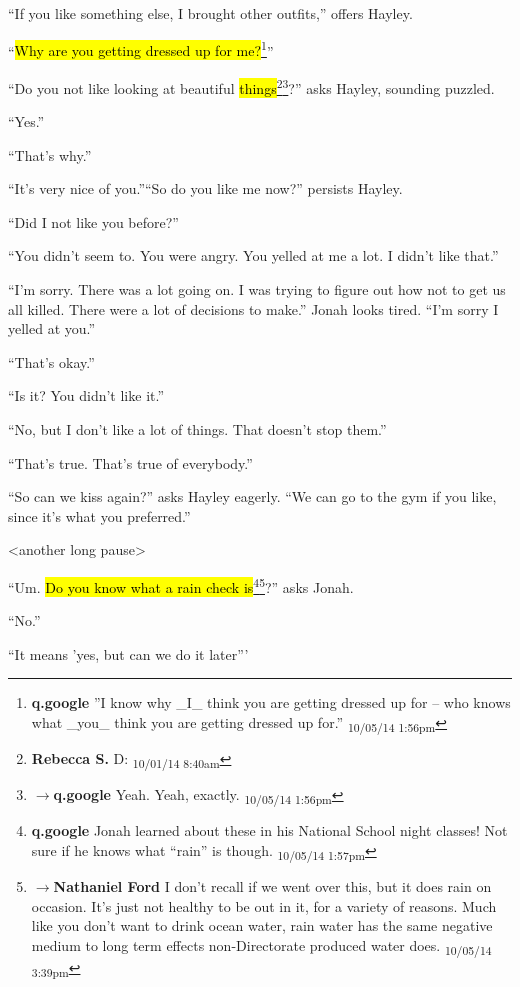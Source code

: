 ``If you like something else, I brought other outfits,'' offers Hayley.

``\hl{Why are you getting dressed up for me?}\footnote{\textbf{q.google }''I know why \_I\_ think you are getting dressed up for -- who knows what \_you\_ think you are getting dressed up for.'' \textsubscript{10/05/14 1:56pm}}''

``Do you not like looking at beautiful \hl{things}\footnote{\textbf{Rebecca S. }D: \textsubscript{10/01/14 8:40am}}\footnote{$\rightarrow$\textbf{q.google }Yeah.  Yeah, exactly. \textsubscript{10/05/14 1:56pm}}?'' asks Hayley, sounding puzzled.

``Yes.''

``That's why.''

``It's very nice of you.''``So do you like me now?'' persists Hayley.

``Did I not like you before?''

``You didn't seem to.  You were angry.  You yelled at me a lot.  I didn't like that.''

``I'm sorry.  There was a lot going on.  I was trying to figure out how not to get us all killed.  There were a lot of decisions to make.''  Jonah looks tired. ``I'm sorry I yelled at you.''

``That's okay.''

``Is it?  You didn't like it.''

``No, but I don't like a lot of things.  That doesn't stop them.''

``That's true.  That's true of everybody.''

``So can we kiss again?'' asks Hayley eagerly.  ``We can go to the gym if you like, since it's what you preferred.''

\textless another long pause\textgreater 

``Um.  \hl{Do you know what a rain check is}\footnote{\textbf{q.google }Jonah learned about these in his National School night classes!  Not sure if he knows what ``rain'' is though. \textsubscript{10/05/14 1:57pm}}\footnote{$\rightarrow$\textbf{Nathaniel Ford }I don't recall if we went over this, but it does rain on occasion. It's just not healthy to be out in it, for a variety of reasons. Much like you don't want to drink ocean water, rain water has the same negative medium to long term effects non-Directorate produced water does. \textsubscript{10/05/14 3:39pm}}?'' asks Jonah.

``No.''

``It means 'yes, but can we do it later'''

